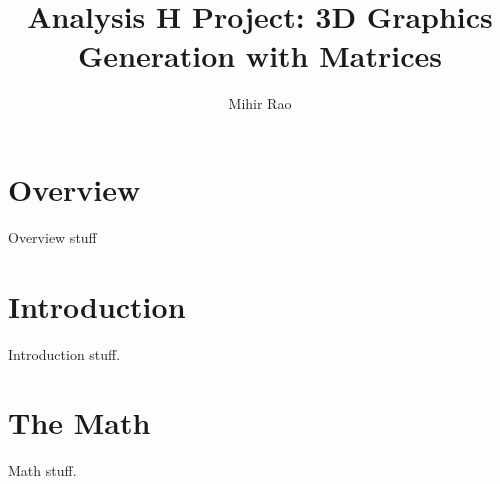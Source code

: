 \documentclass[14pt]{article}
\begin{document}
\title{\textbf{Analysis H Project:} 3D Graphics Generation with Matrices}
\author{Mihir Rao}
\maketitle

\begin{center}
	\vspace{3em}
	
	\vspace{3em}
\end{center}

\section*{Overview}

Overview stuff

\newpage

\section*{Introduction}

Introduction stuff.

\section*{The Math}

Math stuff.
\end{document}
